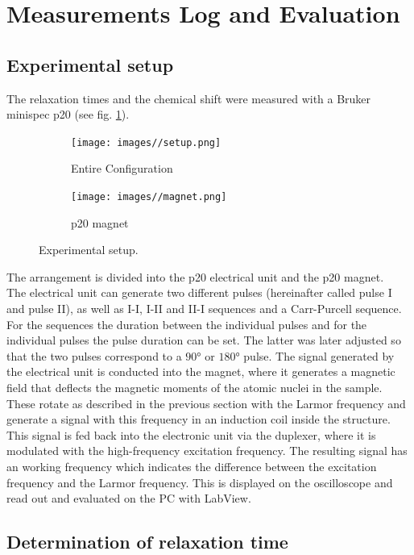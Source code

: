 \newpage
\section{Measurements Log and Evaluation}


\subsection{Experimental setup}
The relaxation times and the chemical shift were measured with a Bruker minispec p20 (see fig. \ref{fig:setup}).
\begin{figure}[ht]
\centering
\begin{subfigure}{.45\textwidth}
\centering
\texttt{[image: images//setup.png]}
\caption{Entire Configuration}
\end{subfigure}
\quad
\begin{subfigure}{.45\textwidth}
\centering
\texttt{[image: images//magnet.png]}
\caption{p20 magnet}
\end{subfigure}
\caption{Experimental setup.}
\label{fig:setup}
\end{figure}
The arrangement is divided into the p20 electrical unit and the p20 magnet.\\
The electrical unit can generate two different pulses (hereinafter called pulse I and pulse II), as well as I-I, I-II and II-I sequences and a Carr-Purcell sequence.
For the sequences the duration between the individual pulses and for the individual pulses the pulse duration can be set.
The latter was later adjusted so that the two pulses correspond to a $\ang{90}$ or $\ang{180}$ pulse.
The signal generated by the electrical unit is conducted into the magnet, where it generates a magnetic field that deflects the magnetic moments of the atomic nuclei in the sample.
These rotate as described in the previous section with the Larmor frequency and generate a signal with this frequency in an induction coil inside the structure.
This signal is fed back into the electronic unit via the duplexer, where it is modulated with the high-frequency excitation frequency.
The resulting signal has an working frequency which indicates the difference between the excitation frequency and the Larmor frequency.
This is displayed on the oscilloscope and read out and evaluated on the PC with LabView.


\subsection{Determination of relaxation time}

